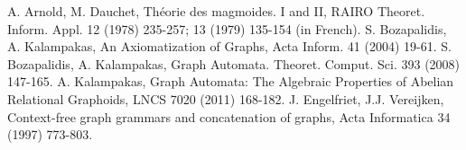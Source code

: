 \documentclass[runningheads,a4paper]{llncs}
\begin{document}
\begin{thebibliography}{99}
  A. Arnold, M. Dauchet, Th\'{e}orie des magmoides. I and II, RAIRO Theoret. Inform. Appl. 12 (1978) 235-257;
13 (1979) 135-154 (in French).
 S. Bozapalidis, A. Kalampakas,  An Axiomatization of Graphs, Acta Inform. 41 (2004) 19-61.
 S. Bozapalidis, A. Kalampakas,  Graph Automata. Theoret. Comput. Sci. 393 (2008) 147-165.
 A. Kalampakas, Graph Automata: The Algebraic Properties of Abelian Relational Graphoids, LNCS 7020 (2011) 168-182.
  J. Engelfriet,  J.J. Vereijken, Context-free graph grammars and concatenation of graphs, Acta Informatica 34 (1997) 773-803.
\end{thebibliography}
\end{document}
